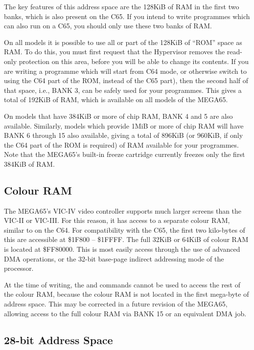 The key features of this address space are the 128KiB of RAM in the first two banks, which is also present on
the C65. If you intend to write programmes which can also run on a C65, you should only use these two banks
of RAM.

On all models it is possible to use all or part of the 128KiB of ``ROM'' space as RAM. To do this, you must first
request that the Hypervisor removes the read-only protection on this area, before you will be able to change
its contents.  If you are writing a programme which will start from C64 mode, or otherwise switch to using the C64
part of the ROM, instead of the C65 part), then the second half of that space, i.e., BANK 3, can be safely used
for your programmes. This gives a total of 192KiB of RAM, which is available on all models of the MEGA65.

On models that have 384KiB or more of chip RAM, BANK 4 and 5 are also available.  Similarly, models which provide
1MiB or more of chip RAM will have BANK 6 through 15 also available, giving a total of 896KiB (or 960KiB, if only
the C64 part of the ROM is required) of RAM available for your programmes.  Note that the MEGA65's built-in
freeze cartridge currently freezes only the first 384KiB of RAM.

\subsection{Colour RAM}

The MEGA65's VIC-IV video controller supports much larger screens than the VIC-II or VIC-III. For this reason, it
has access to a separate colour RAM, similar to on the C64.  For compatibility with the C65, the first two kilo-bytes
of this are accessible at \$1F800 -- \$1FFFF.  The full 32KiB or 64KiB of colour RAM is located at \$FF80000.
This is most easily access through the use of advanced DMA operations, or the 32-bit base-page indirect addressing
mode of the processor.

At the time of writing, the  and  commands cannot be used to access the rest of the colour RAM, because the
colour RAM is not located in the first mega-byte of address space.  This may be corrected in a future revision of
the MEGA65, allowing access to the full colour RAM via BANK 15 or an equivalent DMA job.

\subsection{28-bit Address Space}

